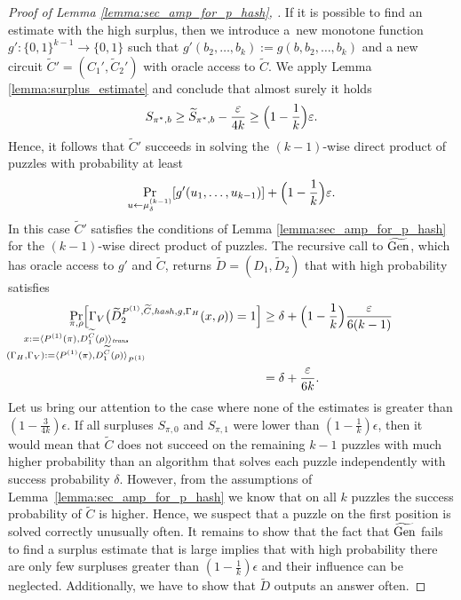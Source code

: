 \begin{proof}[Proof of Lemma \ref{lemma:sec_amp_for_p_hash}, \cite{holenstein2011general}]
If it is possible to find an estimate with the high surplus, then we introduce a~new monotone function $g': \{0,1\}^{k-1} \rightarrow \{0,1\}$
such that $g'(b_2, \dots, b_k) := g(b, b_2, \dots, b_k)$ and a new circuit $\widetilde{C}' = (C_1', \widetilde{C}_2')$
with oracle access to $\widetilde{C}$. We apply Lemma \ref{lemma:surplus_estimate} and conclude that almost surely it holds
\begin{align*}
S_{\pi^*,b} \geq \widetilde{S}_{\pi^*, b} - \frac{\epsilon}{4k} \geq \Bigl(1 - \frac{1}{k}\Bigr)\epsilon.
\end{align*}
Hence, it follows that $\widetilde{C}'$ succeeds in solving the $(k\!-\!1)$-wise direct product of puzzles with probability at least
\begin{align*}
\Pr_{u \leftarrow \mu^{(k-1)}_{\delta}}[g'(u_1,\dots, u_{k-1} )] + \Bigl(1 - \frac{1}{k}\Bigr)\epsilon.
\end{align*}
In this case $\widetilde{C}'$ satisfies the conditions of Lemma \ref{lemma:sec_amp_for_p_hash} for the $(k\!-\!1)$-wise direct product of puzzles.
The recursive call to $\widetilde{\Gen}$, which has oracle access to $g'$ and $\widetilde{C}$, returns $\widetilde{D} = (D_1, \widetilde{D}_2)$
that with high probability satisfies
\begin{align}
  \underset{
    \mathclap{
      \substack{
        \pi, \rho \\
        x := \langle P^{(1)}(\pi), D_1^{\widetilde{C}}(\rho) \rangle_{\mathit{trans}} \\
        (\Gamma_H, \Gamma_V) := \langle P^{(1)}(\pi), D_1^{\widetilde{C}}(\rho) \rangle_{P^{(1)}}}}}
  {\Pr}\Big[\Gamma_V\big(\widetilde{D}_2^{P^{(1)}, \widetilde{C}, \hash, g, \Gamma_H}(x, \rho)) = 1\Big]
  &\geq \delta + \Bigl(1 - \frac{1}{k}\Bigr)\frac{\epsilon}{6(k-1)} \notag\\
  &= \delta + \frac{\epsilon}{6k}.
\end{align}
%
Let us bring our attention to the case where none of the estimates is greater than $(1-\frac{3}{4k})\epsilon$.
If all surpluses $S_{\pi,0}$ and $S_{\pi,1}$ were lower than $(1-\frac{1}{k})\epsilon$, then it would mean that $\widetilde{C}$
does not succeed on the remaining $k-1$ puzzles with much higher probability than an algorithm that solves each puzzle
independently with success probability $\delta$. However, from the assumptions of Lemma~\ref{lemma:sec_amp_for_p_hash}
we know that on all $k$ puzzles the success probability of $\widetilde{C}$ is higher.
Hence, we suspect that a puzzle on the first position is solved correctly unusually often.
It remains to show that the fact that $\widetilde{\Gen}$ fails to find a surplus estimate that is large implies that
with high probability there are only few surpluses greater than $(1-\frac{1}{k})\epsilon$ and their influence
can be neglected.
Additionally, we have to show that $\widetilde{D}$ outputs an answer often.


\end{proof}
